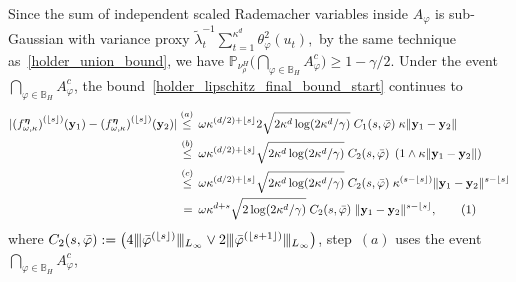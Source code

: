 \documentclass[twoside,11pt]{article}
\newcommand\numberthis{\addtocounter{equation}{1}\tag{\theequation}}
\newcommand{\floor}[1]{\lfloor #1 \rfloor} %
\newcommand{\vectorize}[1]{\mathbf{#1}}
\newcommand{\mP}{\mathbb{P}} %
\newcommand{\dimDensity}{d} %
\newcommand{\smoothness}{s}
\newcommand{\ONset}{\mathbb{B}}
\newcommand{\binNum}{\kappa}           %
\newcommand{\coef}{\theta}
\begin{document}
\begin{appendix}
\begin{itemize}
	Since the sum of independent scaled Rademacher variables inside $A_{\varphi}$ is sub-Gaussian with variance proxy
	$
	\tilde{\lambda}_t^{-1} \sum_{t=1}^{\binNum^\dimDensity} \coef_\varphi^2(u_t),
	$
	by the same technique as~\eqref{holder_union_bound}, we have $\mP_{\nu_\rho^H}
	\bigl(
	\bigcap_{\varphi \in \ONset_H} A_\varphi^c
	\bigr) \geq 1-\gamma/2$.
	Under the event $\bigcap_{\varphi \in \ONset_H} A_\varphi^c$,
	the bound~\eqref{holder_lipschitz_final_bound_start} continues to
	\begin{align*}
		|
		{(f^{{\boldsymbol{\eta}}}_{\omega, \binNum})}^{ (\floor{s})}(\vectorize{y}_1)
		-
		{(f^{{\boldsymbol{\eta}}}_{\omega, \binNum})}^{ (\floor{s})}(\vectorize{y}_2)
		|
		\stackrel{(a)}{\leq} \hskip 1.57mm &
		\omega
		\kappa^{(\dimDensity/2) + \floor{s}}
		2 \sqrt{2\binNum^{\dimDensity} \log(2{\binNum^{\dimDensity}}/\gamma)}
		\; C_1(\smoothness, \bar{\varphi})\;
		\kappa
		\|\vectorize{y}_1-\vectorize{y}_2\|
		\\ \stackrel{(b)}{\leq} \hskip 1.57mm &
		\omega
		\kappa^{(\dimDensity/2) + \floor{s}}
		\sqrt{2\binNum^{\dimDensity} \log(2{\binNum^{\dimDensity}}/\gamma)}
		\; C_2(\smoothness, \bar{\varphi}) \;
		\left(
		1
		\wedge
		\kappa
		\|\vectorize{y}_1-\vectorize{y}_2\|
		\right)
		\\ \stackrel{(c)}{\leq} \hskip 1.57mm &
		\omega
		\kappa^{(\dimDensity/2) + \floor{s}}
		\sqrt{2\binNum^{\dimDensity} \log(2{\binNum^{\dimDensity}}/\gamma)}
		\; C_2(s, \bar{\varphi}) \;
		\binNum^{(s-\floor{s})} \|\vectorize{y}_1 - \vectorize{y}_2\|^{s-\floor{s}}
		\\ = \hskip 1.73mm&
		\omega
		\kappa^{\dimDensity + s}
		\sqrt{2 \log(2{\binNum^{\dimDensity}}/\gamma)}
		\; C_2(s, \bar{\varphi}) \;
		\|\vectorize{y}_1 - \vectorize{y}_2\|^{s-\floor{s}},
		\numberthis \label{eq:two_sample_lower_bound_Holder_basic_ineqs}
	\end{align*}
	where $C_2(\smoothness, \bar{\varphi}) := 
	\bigl(
	4
	\vert\kern-0.25ex
	\vert\kern-0.25ex
	\vert
	\bar{\varphi}^{(\floor{s})}
	\vert\kern-0.25ex
	\vert\kern-0.25ex
	\vert_{L_\infty}
	\vee
	2\vert\kern-0.25ex
	\vert\kern-0.25ex
	\vert
	\bar{\varphi}^{(\floor{s+1})}
	\vert\kern-0.25ex
	\vert\kern-0.25ex
	\vert_{L_\infty}
	\bigr)$,
	step~$(a)$ uses the event $\bigcap_{\varphi \in \ONset_H} A_\varphi^c$, 

\end{itemize}
\end{appendix}
\end{document}
